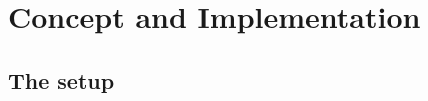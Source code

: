 \chapter{Concept and Implementation}
\label{chap:concept_and_implementation}

\begin{comment}
Super loop:
1. Fetch current control value and feedback from system
2. Calculate new output value accordingly
3. Adjust output (PWM)

PD or PDI Control?


Bare-metal vs
Preempt-RT vs
linux
\end{comment}

\section{The setup}
